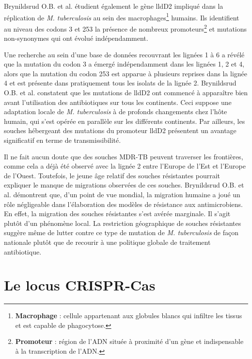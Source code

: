 \documentclass[twoside,a4paper,11pt,frenchb,openany]{report}
\begin{document}
Brynildsrud O.B. et al. étudient également le gène lldD2 impliqué dans la réplication de \textit{M. tuberculosis} au sein des macrophages\footnote{\textbf{Macrophage} : cellule appartenant aux globules blancs qui infiltre les tissus et est capable de phagocytose.} humains. Ils identifient au niveau des codons 3 et 253 la présence de nombreux promoteurs\footnote{\textbf{Promoteur} : région de l'ADN située à proximité d'un gène et indispensable à la transcription de l'ADN.} et mutations non-synonymes qui ont évolué indépendamment.

Une recherche au sein d'une base de données recouvrant les lignées 1 à 6 a révélé que la mutation du codon 3 a émergé indépendamment dans les lignées 1, 2 et 4, alors que la mutation du codon 253 est apparue à plusieurs reprises dans la lignée 4 et est présente dans pratiquement tous les isolats de la lignée 2. Brynildsrud O.B. et al. constatent que les mutations de lldD2 ont commencé à apparaître bien avant l'utilisation des antibiotiques sur tous les continents. Ceci suppose une adaptation locale de \textit{M. tuberculosis} à de profonds changements chez l'hôte humain, qui s'est opérée en parallèle sur les différents continents. Par ailleurs, les souches hébergeant des mutations du promoteur lldD2 présentent un avantage significatif en terme de transmissibilité.

Il ne fait aucun doute que des souches MDR-TB peuvent traverser les frontières, comme cela a déjà été observé avec la lignée 2 entre l'Europe de l'Est et l'Europe de l'Ouest. Toutefois, le jeune âge relatif des souches résistantes pourrait expliquer le manque de migrations observées de ces souches. Brynildsrud O.B. et al. démontrent que, d'un point de vue mondial, la migration humaine a joué un rôle négligeable dans l'élaboration des modèles de résistance aux antimicrobiens. En effet, la migration des souches résistantes s'est avérée marginale. Il s'agit plutôt d'un phénomène local. La restriction géographique de souches résistantes suggère même de lutter contre ce type de mutation de \textit{M. tuberculosis} de façon nationale plutôt que de recourir à une politique globale de traitement antibiotique.


\section{Le locus CRISPR-Cas}
\end{document}
